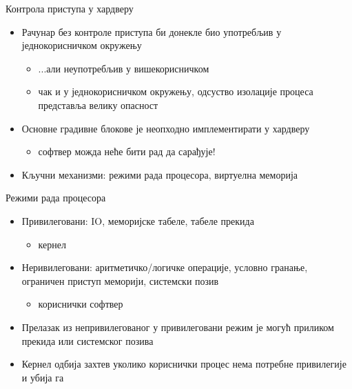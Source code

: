 \documentclass[xcolor=table]{beamer}
\begin{document}
    \begin{frame}[allowframebreaks]{Контрола приступа у хардверу}
        \begin{itemize}
            \item Рачунар без контроле приступа би донекле био употребљив у једнокорисничком окружењу
            \begin{itemize}
                \item ...али неупотребљив у вишекорисничком
                \item чак и у једнокорисничком окружењу, одсуство изолације процеса представља велику опасност
            \end{itemize}
            \item Основне градивне блокове је неопходно имплементирати у хардверу
            \begin{itemize}
                \item софтвер можда неће бити рад да сарађује!
            \end{itemize}
            \item Кључни механизми: режими рада процесора, виртуелна меморија
        \end{itemize}
    \end{frame}
    
    \begin{frame}{Режими рада процесора}
        \begin{itemize}
            \item Привилеговани: IO, меморијске табеле, табеле прекида
            \begin{itemize}
                \item кернел
            \end{itemize}
            \item Неривилеговани: аритметичко/логичке операције, условно гранање, ограничен приступ меморији, системски позив
            \begin{itemize}
                \item кориснички софтвер
            \end{itemize}
            \item Прелазак из непривилегованог у привилеговани режим је могућ приликом прекида или системског позива
            \item Кернел одбија захтев уколико кориснички процес нема потребне привилегије и убија га
        \end{itemize}
    \end{frame}
    
\end{document}
